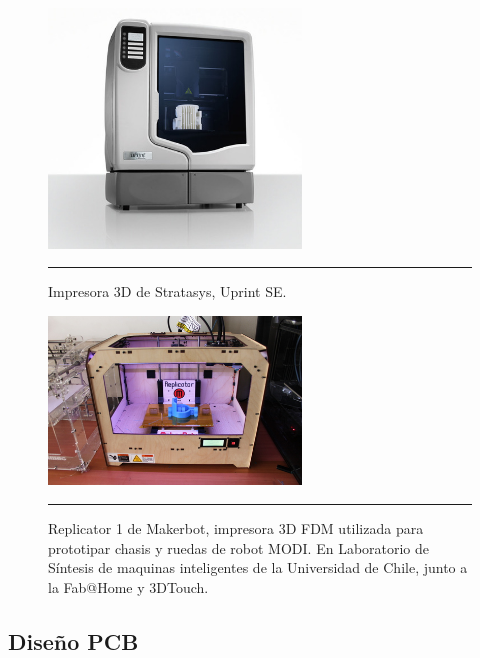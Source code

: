 \begin{figure}[htbp]
	\centering
		\includegraphics[width=0.6\textwidth]{./Figures/uprint.jpg}
		\rule{35em}{0.5pt}
	\caption[uprint]{Impresora 3D de Stratasys, Uprint SE.}
	\label{fig:uprint}
\end{figure}	


\begin{figure}[htbp]
	\centering
		\includegraphics[width=0.6\textwidth]{./Figures/replicator1.jpg}
		\rule{35em}{0.5pt}
	\caption[Replicator1]{Replicator 1 de Makerbot, impresora 3D FDM utilizada para prototipar chasis y ruedas de robot MODI. En Laboratorio de Síntesis de maquinas inteligentes de la Universidad de Chile, junto a la Fab@Home y 3DTouch.}
	\label{fig:replicator}
\end{figure}	


\newpage

\subsection{Diseño PCB}


